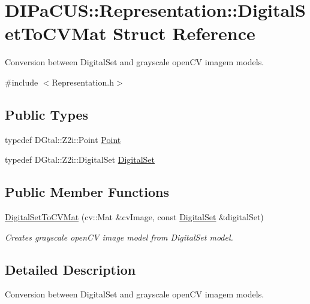 \hypertarget{structDIPaCUS_1_1Representation_1_1DigitalSetToCVMat}{}\section{D\+I\+Pa\+C\+US\+:\+:Representation\+:\+:Digital\+Set\+To\+C\+V\+Mat Struct Reference}
\label{structDIPaCUS_1_1Representation_1_1DigitalSetToCVMat}


Conversion between Digital\+Set and grayscale open\+CV imagem models.  




{\ttfamily \#include $<$Representation.\+h$>$}

\subsection*{Public Types}
\begin{DoxyCompactItemize}
\item 
typedef D\+Gtal\+::\+Z2i\+::\+Point \mbox{\hyperlink{structDIPaCUS_1_1Representation_1_1DigitalSetToCVMat_aac2a2eb35e461cdd0979514ad82b37ec}{Point}}
\item 
typedef D\+Gtal\+::\+Z2i\+::\+Digital\+Set \mbox{\hyperlink{structDIPaCUS_1_1Representation_1_1DigitalSetToCVMat_a476ca922b6635faab97aa112341663a9}{Digital\+Set}}
\end{DoxyCompactItemize}
\subsection*{Public Member Functions}
\begin{DoxyCompactItemize}
\item 
\mbox{\hyperlink{structDIPaCUS_1_1Representation_1_1DigitalSetToCVMat_a07a54dd29af75029e5f77d2ef41ce844}{Digital\+Set\+To\+C\+V\+Mat}} (cv\+::\+Mat \&cv\+Image, const \mbox{\hyperlink{structDIPaCUS_1_1Representation_1_1DigitalSetToCVMat_a476ca922b6635faab97aa112341663a9}{Digital\+Set}} \&digital\+Set)
\begin{DoxyCompactList}\small\item\em Creates grayscale open\+CV image model from Digital\+Set model. \end{DoxyCompactList}\end{DoxyCompactItemize}


\subsection{Detailed Description}
Conversion between Digital\+Set and grayscale open\+CV imagem models. 




